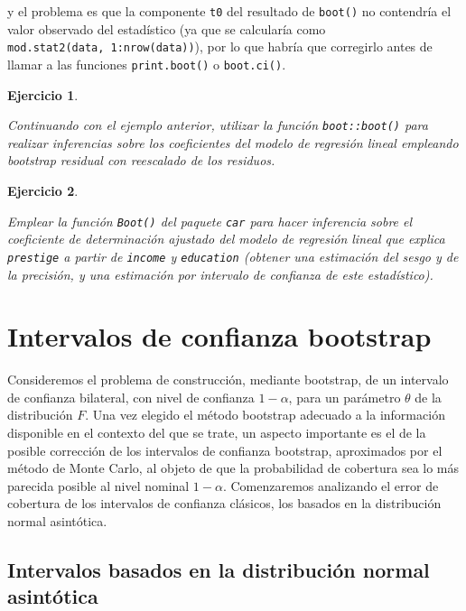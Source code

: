 \documentclass[
]{book}
\theoremstyle{break}
\newtheorem{exercise}{Ejercicio}[chapter]
\theoremstyle{nonumberplain}
\begin{document}
y el problema es que la componente \texttt{t0} del resultado de \texttt{boot()} no contendría el valor observado del estadístico (ya que se calcularía como \texttt{mod.stat2(data,\ 1:nrow(data))}), por lo que habría que corregirlo antes de llamar a las funciones \texttt{print.boot()} o \texttt{boot.ci()}.

\begin{exercise}
\protect\hypertarget{exr:boot-coef}{}\label{exr:boot-coef}

Continuando con el ejemplo anterior, utilizar la función \texttt{boot::boot()} para realizar inferencias sobre los coeficientes del modelo de regresión lineal empleando bootstrap residual con reescalado de los residuos.
\end{exercise}

\begin{exercise}
\protect\hypertarget{exr:boot-car}{}\label{exr:boot-car}

Emplear la función \texttt{Boot()} del paquete \texttt{car} para hacer inferencia sobre
el coeficiente de determinación ajustado del modelo de regresión lineal
que explica \texttt{prestige} a partir de \texttt{income} y \texttt{education}
(obtener una estimación del sesgo y de la precisión,
y una estimación por intervalo de confianza de este estadístico).
\end{exercise}

\chapter{Intervalos de confianza bootstrap}\label{icboot}

Consideremos el problema de construcción, mediante bootstrap, de un
intervalo de confianza bilateral, con nivel de confianza \(1-\alpha\),
para un parámetro \(\theta\) de la distribución \(F\). Una vez elegido el
método bootstrap adecuado a la información disponible en el contexto del
que se trate, un aspecto importante es el de la posible corrección de
los intervalos de confianza bootstrap, aproximados por el método de
Monte Carlo, al objeto de que la probabilidad de cobertura sea lo más
parecida posible al nivel nominal \(1-\alpha\). Comenzaremos analizando
el error de cobertura de los intervalos de confianza clásicos, los
basados en la distribución normal asintótica.

\section{Intervalos basados en la distribución normal asintótica}\label{icboot-norm}
\end{document}

